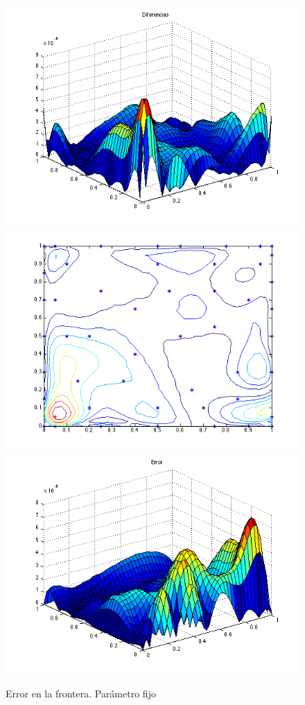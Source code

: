 \documentclass[11pt,a4paper]{article}
\begin{document}
\begin{figure}

\includegraphics[scale=.27]{diferencias3.png}
\includegraphics[scale=.27]{centros3.png}
\includegraphics[scale=.27]{error3.png}
\caption{Error en la frontera. Parámetro fijo}
\end{figure}
\end{document}
